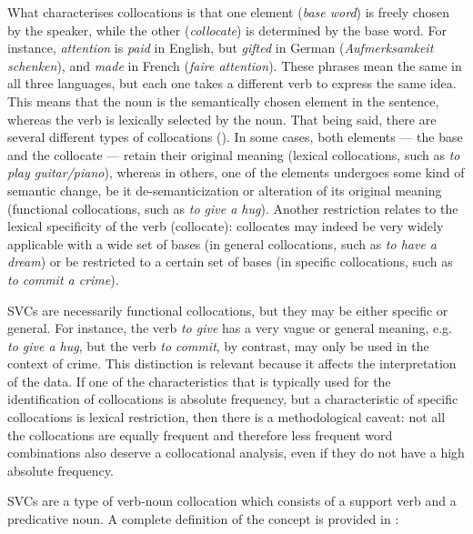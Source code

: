 \documentclass[output=paper,colorlinks,citecolor=brown]{langscibook}
\begin{document}
What characterises collocations is that one element (\emph{base word}) is freely chosen by
the speaker, while the other (\emph{collocate}) is determined by the base word. For
instance, \emph{attention} is \emph{paid} in English, but \emph{gifted} in German
(\emph{Aufmerksamkeit schenken}), and \emph{made} in French (\emph{faire attention}). These
phrases mean the same in all three languages, but each one takes a different verb to
express the same idea. This means that the noun is the semantically chosen element in the
sentence, whereas the verb is lexically selected by the noun. That being said, there are
several different types of collocations (\cite{banos_construcciones_2018}). In some cases,
both elements --- the base and the collocate --- retain their original meaning (lexical
collocations, such as \emph{to play guitar/piano}), whereas in others, one of the elements
undergoes some kind of semantic change, be it de-semanticization or alteration of its
original meaning (functional collocations, such as \emph{to give a hug}). Another
restriction relates to the lexical specificity of the verb (collocate): collocates may
indeed be very widely applicable with a wide set of bases (in general
collocations\emph{,} such as \emph{to have a dream}) or be restricted to a certain set of
bases (in specific collocations, such as \emph{to commit a crime}).

SVCs are necessarily functional collocations, but they may be either specific or general.
For instance, the verb \emph{to give} has a very vague or general meaning, e.g.
\emph{to give a hug}, but the verb \emph{to commit}, by contrast, may only be used in the
context of crime. This distinction is relevant because it affects the interpretation of
the data. If one of the characteristics that is typically used for the identification of
collocations is absolute frequency, but a characteristic of specific collocations is
lexical restriction, then there is a methodological caveat: not
all the collocations are equally frequent and therefore less frequent word combinations also
deserve a collocational analysis, even if they do not have a high absolute frequency.

SVCs are a type of verb-noun collocation which consists of a support verb and a
predicative noun. A complete definition of the concept is provided in
\citet[7]{mendozar_cruz_causatividad_2015}:
\end{document}
